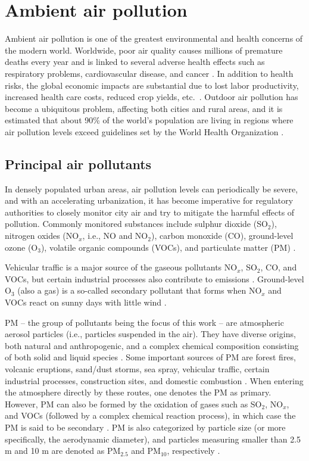 \section{Ambient air pollution}

Ambient air pollution is one of the greatest environmental and health concerns of the modern world. Worldwide, poor air quality causes millions of premature deaths every year and is linked to several adverse health effects such as respiratory problems, cardiovascular disease, and cancer \cite{who2016}. In addition to health risks, the global economic impacts are substantial due to lost labor productivity, increased health care costs, reduced crop yields, etc.\ \cite{oecd2016}. Outdoor air pollution has become a ubiquitous problem, affecting both cities and rural areas, and it is estimated that about 90\% of the world's population are living in regions where air pollution levels exceed guidelines set by the World Health Organization \cite{who2016}. 

\subsection{Principal air pollutants}
\label{sec:airpollutants}
In densely populated urban areas, air pollution levels can periodically be severe, and with an accelerating urbanization, it has become imperative for regulatory authorities to closely monitor city air and try to mitigate the harmful effects of pollution. Commonly monitored substances include sulphur dioxide (SO$_2$), nitrogen oxides (NO$_x$, i.e., NO and NO$_2$), carbon monoxide (CO), ground-level ozone (O$_3$), volatile organic compounds (VOCs), and particulate matter (PM) \cite{VanLoon2010}. 

Vehicular traffic is a major source of the gaseous pollutants NO$_x$, SO$_2$, CO, and VOCs, but certain industrial processes also contribute to emissions \cite{VanLoon2010}. Ground-level O$_3$ (also a gas) is a so-called secondary pollutant that forms when NO$_x$ and VOCs react on sunny days with little wind \cite{VanLoon2010}. 

PM -- the group of pollutants being the focus of this work -- are atmospheric aerosol particles (i.e., particles suspended in the air). They have diverse origins, both natural and anthropogenic, and a complex chemical composition consisting of both solid and liquid species \cite{Schwarzenbach2016}. Some important sources of PM are forest fires, volcanic eruptions, sand/dust storms, sea spray, vehicular traffic, certain industrial processes, construction sites, and domestic combustion \cite{Querol2004, Schwarzenbach2016}. When entering the atmosphere directly by these routes, one denotes the PM as primary. However, PM can also be formed by the oxidation of gases such as SO$_2$, NO$_x$, and VOCs (followed by a complex chemical reaction process), in which case the PM is said to be secondary \cite{Schwarzenbach2016}. PM is also categorized by particle size (or more specifically, the aerodynamic diameter), and particles measuring smaller than 2.5 \textmugreek m and 10 \textmugreek m are denoted as PM$_{2.5}$ and PM$_{10}$, respectively \cite{Schwarzenbach2016}.

